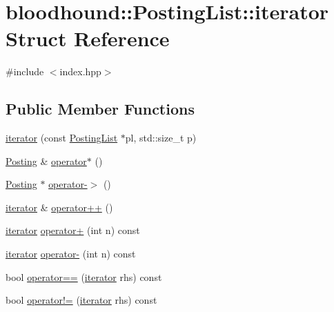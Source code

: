 \hypertarget{structbloodhound_1_1PostingList_1_1iterator}{}\section{bloodhound\+:\+:Posting\+List\+:\+:iterator Struct Reference}
\label{structbloodhound_1_1PostingList_1_1iterator}


{\ttfamily \#include $<$index.\+hpp$>$}

\subsection*{Public Member Functions}
\begin{DoxyCompactItemize}
\item 
\hyperlink{structbloodhound_1_1PostingList_1_1iterator_af815248890d1f92dbd2cc3fa5813875a}{iterator} (const \hyperlink{classbloodhound_1_1PostingList}{Posting\+List} $\ast$pl, std\+::size\+\_\+t p)
\item 
\hyperlink{structbloodhound_1_1Posting}{Posting} \& \hyperlink{structbloodhound_1_1PostingList_1_1iterator_a386a2af6b962ddd85392f1313eb16eff}{operator$\ast$} ()
\item 
\hyperlink{structbloodhound_1_1Posting}{Posting} $\ast$ \hyperlink{structbloodhound_1_1PostingList_1_1iterator_a8c9120139692d6672b52d96301718614}{operator-\/$>$} ()
\item 
\hyperlink{structbloodhound_1_1PostingList_1_1iterator}{iterator} \& \hyperlink{structbloodhound_1_1PostingList_1_1iterator_a8b0c2e4221f0ce3ea893c2fc37edbd53}{operator++} ()
\item 
\hyperlink{structbloodhound_1_1PostingList_1_1iterator}{iterator} \hyperlink{structbloodhound_1_1PostingList_1_1iterator_a8672fb454e60ed068ae02078976543f9}{operator+} (int n) const
\item 
\hyperlink{structbloodhound_1_1PostingList_1_1iterator}{iterator} \hyperlink{structbloodhound_1_1PostingList_1_1iterator_a61a5de181ff84ddc0976957a7a9fcfd7}{operator-\/} (int n) const
\item 
bool \hyperlink{structbloodhound_1_1PostingList_1_1iterator_af82060f61f9231ee449e43ea347cab29}{operator==} (\hyperlink{structbloodhound_1_1PostingList_1_1iterator}{iterator} rhs) const
\item 
bool \hyperlink{structbloodhound_1_1PostingList_1_1iterator_aa293b4e0607edaca2fde163c8ee0f00e}{operator!=} (\hyperlink{structbloodhound_1_1PostingList_1_1iterator}{iterator} rhs) const
\end{DoxyCompactItemize}
